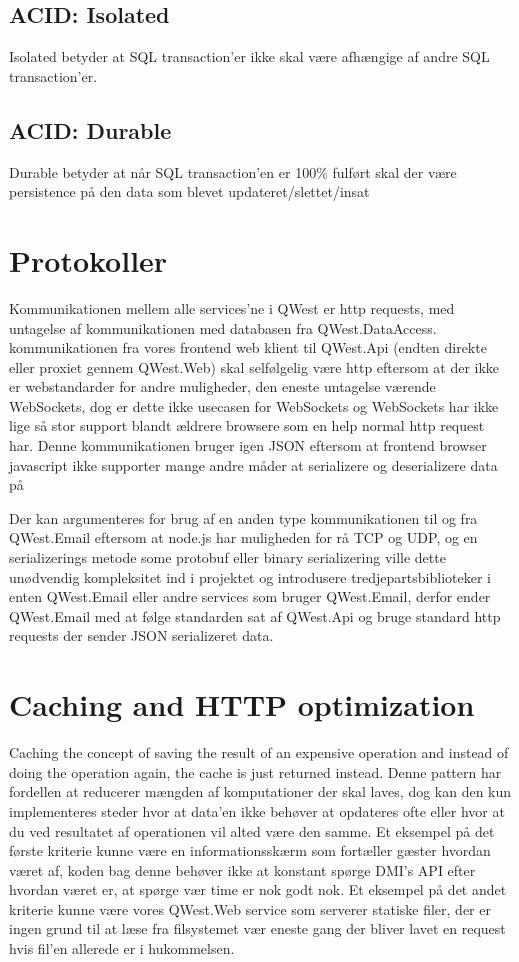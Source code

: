 \subsection{ACID: Isolated}\label{sec:acidIsolated}
Isolated betyder at SQL transaction'er ikke skal være afhængige af andre SQL transaction'er.

\subsection{ACID: Durable}\label{sec:acidDurable}
Durable betyder at når SQL transaction'en er 100\% fulført skal der være persistence på den data som blevet updateret/slettet/insat

\section{Protokoller}\label{sec:protocols}
Kommunikationen mellem alle services'ne i QWest er http requests, med untagelse af kommunikationen med databasen fra QWest.DataAccess. kommunikationen fra vores frontend web klient til QWest.Api (endten direkte eller proxiet gennem QWest.Web) skal selfølgelig være http eftersom at der ikke er webstandarder for andre muligheder, den eneste untagelse værende WebSockets, dog er dette ikke usecasen for WebSockets og WebSockets har ikke lige så stor support blandt ældrere browsere som en help normal http request har. Denne kommunikationen bruger igen JSON eftersom at frontend browser javascript ikke supporter mange andre måder at serializere og deserializere data på

Der kan argumenteres for brug af en anden type kommunikationen til og fra QWest.Email eftersom at node.js har muligheden for rå TCP og UDP, og en serializerings metode some protobuf \cite{ProtoBuf} eller binary serializering \cite{CsharpBinarySerialization} ville dette unødvendig kompleksitet ind i projektet og introdusere tredjepartsbiblioteker i enten QWest.Email eller andre services som bruger QWest.Email, derfor ender QWest.Email med at følge standarden sat af QWest.Api og bruge standard http requests der sender JSON serializeret data.

\section{Caching and HTTP optimization}\label{sec:caching}
Caching the concept of saving the result of an expensive operation and instead of doing the operation again, the cache is just returned instead. Denne pattern har fordellen at reducerer mængden af komputationer der skal laves, dog kan den kun implementeres steder hvor at data'en ikke behøver at opdateres ofte eller hvor at du ved resultatet af operationen vil alted være den samme. Et eksempel på det første kriterie kunne være en informationsskærm som fortæller gæster hvordan været af, koden bag denne behøver ikke at konstant spørge DMI's API efter hvordan været er, at spørge vær time er nok godt nok. Et eksempel på det andet kriterie kunne være vores QWest.Web service som serverer statiske filer, der er ingen grund til at læse fra filsystemet vær eneste gang der bliver lavet en request hvis fil'en allerede er i hukommelsen.

